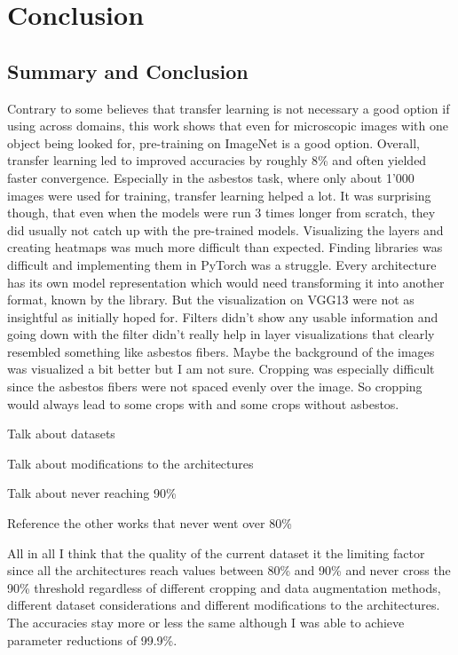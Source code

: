\chapter{Conclusion}

\section{Summary and Conclusion}

Contrary to some believes that transfer learning is not necessary a good option if using across domains, this work shows that even for microscopic images with one object being looked for, pre-training on ImageNet is a good option. Overall, transfer learning led to improved accuracies by roughly 8\% and often yielded faster convergence. Especially in the asbestos task, where only about 1'000 images were used for training, transfer learning helped a lot. It was surprising though, that even when the models were run 3 times longer from scratch, they did usually not catch up with the pre-trained models.
Visualizing the layers and creating heatmaps was much more difficult than expected. Finding libraries was difficult and implementing them in PyTorch was a struggle. Every architecture has its own model representation which would need transforming it into another format, known by the library. But the visualization on VGG13 were not as insightful as initially hoped for. Filters didn't show any usable information and going down with the filter didn't really help in layer visualizations that clearly resembled something like asbestos fibers. Maybe the background of the images was visualized a bit better but I am not sure.
Cropping was especially difficult since the asbestos fibers were not spaced evenly over the image. So cropping would always lead to some crops with and some crops without asbestos.

Talk about datasets

Talk about modifications to the architectures

Talk about never reaching 90\%

Reference the other works that never went over 80\%

All in all I think that the quality of the current dataset it the limiting factor since all the architectures reach values between 80\% and 90\% and never cross the 90\% threshold regardless of different cropping and data augmentation methods, different dataset considerations and different modifications to the architectures. The accuracies stay more or less the same although I was able to achieve parameter reductions of 99.9\%.

